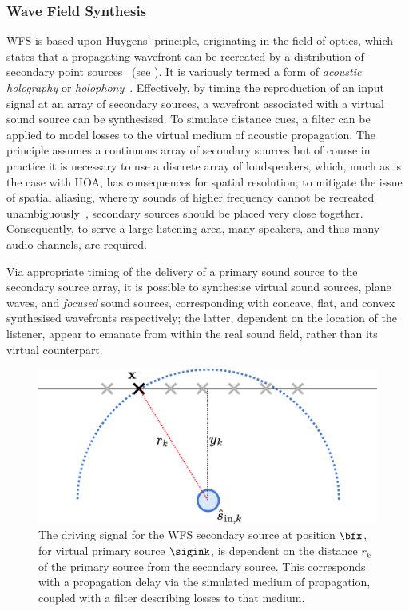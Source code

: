 \subsubsection{Wave Field Synthesis}

WFS is based upon Huygens' principle, originating in the field of optics, which
states that a propagating wavefront can be recreated by a distribution of
secondary point sources~\citep{mueller_acoustic_1971,berkhout_acoustic_1993,
    belloch_performance_2021} (see ).
It is variously termed a form of \textit{acoustic holography} or
\textit{holophony}~\citep{berkhout_holographic_1988,ahrens_analytic_2012}.
Effectively, by timing the reproduction of an input signal at an array of
secondary sources, a wavefront associated with a virtual sound source can be
synthesised.
To simulate distance cues, a filter can be applied to model losses to the
virtual medium of acoustic propagation.
The principle assumes a continuous array of secondary sources but of course in
practice it is necessary to use a discrete array of loudspeakers, which,
much as is the case with HOA, has consequences for spatial resolution;
to mitigate the issue of spatial aliasing, whereby sounds of higher frequency
cannot be recreated unambiguously~\citep{winter_geometric_2018}, secondary
sources should be placed very close together.
Consequently, to serve a large listening area, many speakers, and thus many
audio channels, are required.

Via appropriate timing of the delivery of a primary sound source to the
secondary source array, it is possible to synthesise virtual sound sources,
plane waves, and \textit{focused} sound sources, corresponding with concave,
flat, and convex synthesised wavefronts respectively; the latter, dependent
on the location of the listener, appear to emanate from within the real
sound field, rather than its virtual counterpart.

\begin{figure}[ht]
    \centering
    \includegraphics[width=.75\textwidth]{figures/wfs_2}
    \caption{
        The driving signal for the WFS secondary source at position $\bfx$,
        for virtual primary source $\sigink$, is dependent on the distance
        $r_k$ of the primary source from the secondary source.
        This corresponds with a propagation delay via the simulated medium of
        propagation, coupled with a filter describing losses to that medium.
    }
    \label{fig:wfs_2}
\end{figure}

